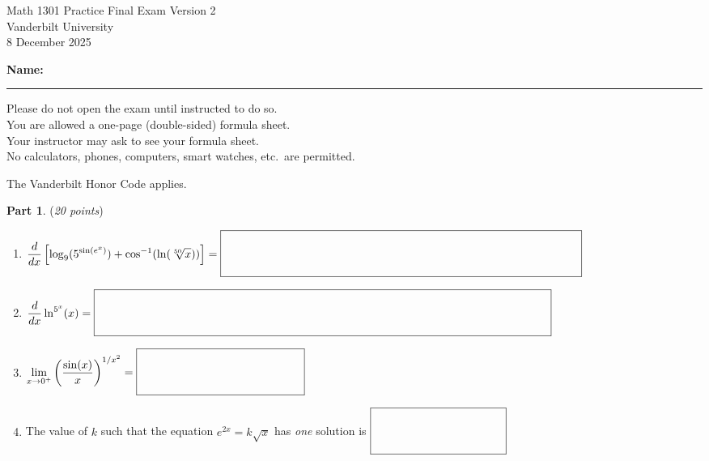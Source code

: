 \documentclass[12pt]{article}
\begin{document}
\begin{center}
    \Large Math 1301 \quad Practice Final Exam Version 2 \\[1em]
    \normalsize Vanderbilt University \\[1em]
    8 December 2025
\end{center}

\vspace{2cm}

\noindent \textbf{Name:} \rule{12cm}{0.4pt}

\vfill

\begin{center}
\begin{minipage}{0.9\textwidth}
\centering
Please do not open the exam until instructed to do so. \\
You are allowed a one-page (double-sided) formula sheet. \\
Your instructor may ask to see your formula sheet. \\
No calculators, phones, computers, smart watches, etc.\ are permitted.
\end{minipage}
\end{center}

\vspace{1.5cm}

\begin{center}
The Vanderbilt Honor Code applies.
\end{center}



\newpage

\textbf{Part 1}. (\textit{20 points}) 
\begin{enumerate}[label=\textbf{Q\arabic*}]
    \item  $\displaystyle \frac{d}{dx}\left[\log_{9}(5^{\sin(e^{x})})+\cos^{-1}(\ln(\sqrt[50]{x}))\right]=\fbox{\raisebox{-0.4\height}{\makebox[11cm]{\rule{0pt}{8ex}}}}$
    \vspace{3.5cm}
    \item $\displaystyle\frac{d}{dx}\ln^{5^{x}}(x)=\fbox{\raisebox{-0.4\height}{\makebox[14cm]{\rule{0pt}{8ex}}}}$
    \vspace{3.5cm}
    \item $\displaystyle \lim_{x\to 0^{+}}\left(\frac{\sin(x)}{x}\right)^{1/x^{2}}=\fbox{\raisebox{-0.4\height}{\makebox[5cm]{\rule{0pt}{8ex}}}}$ 
    \vspace{5.5cm}
    \item The value of $k$ such that the equation $e^{2x}=k\sqrt{x}$ has \textit{one} solution is $\fbox{\raisebox{-0.4\height}{\makebox[4cm]{\rule{0pt}{8ex}}}}$
\end{enumerate}
\end{document}
